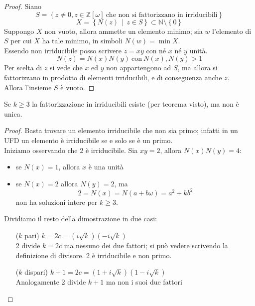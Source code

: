 \begin{proof}
	Siano
	\begin{equation*}
		S=\left\{z\neq0, z \in \mathbb{Z}[\omega] \ \text{che non si fattorizzano in irriducibili}\right\}
	\end{equation*}
	\begin{equation*}
		X=\left\{N(z) \, \mid \, z \in S\right\}\subset\mathbb{N}\setminus\left\{0\right\}
	\end{equation*}
	Suppongo $X$ non vuoto, allora ammette un elemento minimo; sia $w$ l'elemento di $S$ per cui $X$ ha tale minimo, in simboli $N(w)=\min X$. \\ Essendo non irriducibile posso scrivere $z=xy$ con né $x$ né $y$ unità.
	\begin{equation*}
	N(z)=N(x)N(y) \ \text{con} \ N(x),N(y)>1 
	\end{equation*}
	Per scelta di $z$ si vede che $x$ ed $y$ non appartengono ad $S$, ma allora si fattorizzano in prodotto di elementi irriducibili, e di conseguenza anche $z$. \\ Allora l'insieme $S$ è vuoto.
\end{proof}
\begin{proposizione}
	Se $k\geq3$ la fattorizzazione in irriducibili esiste (per teorema visto), ma non è unica.
\end{proposizione}
\begin{proof}
	Basta trovare un elemento irriducibile che non sia primo; infatti in un UFD un elemento è irriducibile se e solo se è un primo. \\
	Iniziamo osservando che 2 è irriducibile. Sia $xy=2$, allora $N(x)N(y)=4$: 
	\begin{itemize}
		\item se $N(x)=1$, allora $x$ è una unità
		\item se $N(x)=2$ allora $N(y)=2$, ma 
		\begin{equation*}
		2=N(x)=N(a+b\omega)=a^2+kb^2
		\end{equation*}
		non ha soluzioni intere per $k\geq 3$.
	\end{itemize}
	Dividiamo il resto della dimostrazione in due casi:
	\begin{itemize}
		\item[($k$ pari)] $k=2c=(i\sqrt{k})(-i\sqrt{k})$\\ 2 divide $k=2c$ ma nessuno dei due fattori; si può vedere scrivendo la definizione di divisore. 2 è irriducibile e non primo.
		\item[($k$ dispari)] $k+1=2c=(1+i\sqrt{k})(1-i\sqrt{k})$\\ Analogamente 2 divide $k+1$ ma non i suoi due fattori
	\end{itemize}
\end{proof}

